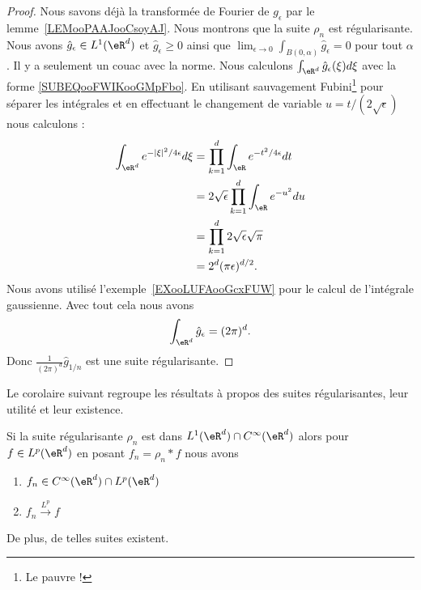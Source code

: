 \begin{proof}
	Nous savons déjà la transformée de Fourier de \( g_{\epsilon}\) par le lemme~\ref{LEMooPAAJooCsoyAJ}. Nous montrons que la suite \( \rho_n\) est régularisante. Nous avons \( \hat g_{\epsilon}\in L^1(\eR^d)\) et \( \hat g_{\epsilon}\geq 0\) ainsi que \( \lim_{\epsilon\to 0}\int_{B(0,\alpha)}\hat  g_{\epsilon}=0\) pour tout \( \alpha\). Il y a seulement un couac avec la norme. Nous calculons \( \int_{\eR^d}\hat g_{\epsilon}(\xi)d\xi\) avec la forme \eqref{SUBEQooFWIKooGMpFbo}. En utilisant sauvagement Fubini\footnote{Le pauvre !} pour séparer les intégrales et en effectuant le changement de variable \( u=t/(2\sqrt{ \epsilon })\) nous calculons :
	\begin{subequations}
		\begin{align}
			\int_{\eR^d} e^{-| \xi |^2/4\epsilon}d\xi & =\prod_{k=1}^d\int_{\eR} e^{-t^2/4\epsilon}dt         \\
			                                          & =2\sqrt{ \epsilon }\prod_{k=1}^d\int_{\eR} e^{-u^2}du \\
			                                          & =\prod_{k=1}^d2\sqrt{ \epsilon }\sqrt{ \pi }          \\
			                                          & =2^d(\pi\epsilon)^{d/2}.
		\end{align}
	\end{subequations}
	Nous avons utilisé l'exemple~\ref{EXooLUFAooGcxFUW} pour le calcul de l'intégrale gaussienne. Avec tout cela nous avons
	\begin{equation}
		\int_{\eR^d}\hat g_{\epsilon}=(2\pi)^d.
	\end{equation}
	Donc \( \frac{1}{ (2\pi)^d }\hat g_{1/n}\) est une suite régularisante.
\end{proof}

Le corolaire suivant regroupe les résultats à propos des suites régularisantes, leur utilité et leur existence.
\begin{corollary}       \label{CORooQLELooUjzIoM}
	Si la suite régularisante \( \rho_n\) est dans \( L^1(\eR^d)\cap  C^{\infty}(\eR^d)\) alors pour \( f\in L^p(\eR^d)\) en posant \( f_n=\rho_n*f\) nous avons
	\begin{enumerate}
		\item
		      \( f_n\in C^{\infty}(\eR^d)\cap L^p(\eR^d)\)
		\item
		      \( f_n\stackrel{L^p}{\longrightarrow}f\)
	\end{enumerate}
	De plus, de telles suites existent.
\end{corollary}

